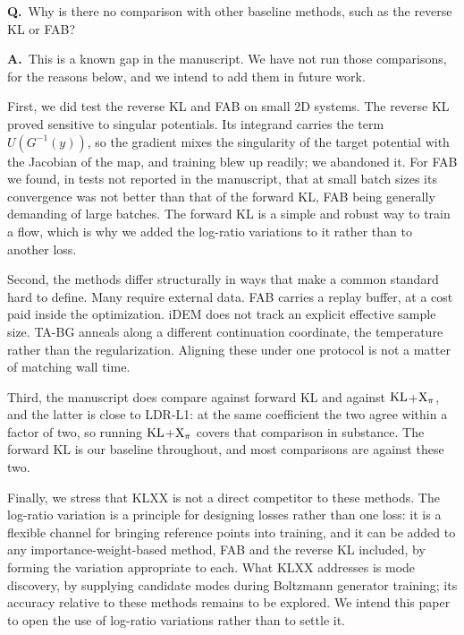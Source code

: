 \documentclass[11pt]{article}
\newcounter{qa}
\newcommand{\QA}[2]{%
  \par\bigskip
  \noindent\textbf{Q\theqa.}~#1\par
  \medskip
  \noindent\textbf{A\theqa.}~#2\par
  \medskip
}
\newcommand{\Q}[1]{\refstepcounter{qa}\QA{#1}}
\begin{document}
\Q{Why is there no comparison with other baseline methods, such as the reverse
KL or FAB?}
{This is a known gap in the manuscript. We have not run those comparisons, for
the reasons below, and we intend to add them in future work.

First, we did test the reverse KL and FAB on small 2D systems. The reverse KL
proved sensitive to singular potentials. Its integrand carries the term
$U(G^{-1}(y))$, so the gradient mixes the singularity of the target potential
with the Jacobian of the map, and training blew up readily; we abandoned it. For
FAB we found, in tests not reported in the manuscript, that at small batch sizes
its convergence was not better than that of the forward KL, FAB being generally
demanding of large batches. The forward KL is a simple and robust way to train a
flow, which is why we added the log-ratio variations to it rather than to
another loss.

Second, the methods differ structurally in ways that make a common standard hard
to define. Many require external data. FAB carries a replay buffer, at a cost
paid inside the optimization. iDEM does not track an explicit effective sample
size. TA-BG anneals along a different continuation coordinate, the temperature
rather than the regularization. Aligning these under one protocol is not a
matter of matching wall time.

Third, the manuscript does compare against forward KL and against
$\mathrm{KL}$+$\mathrm{X}_\pi$, and the latter is close to LDR-L1: at the same coefficient the
two agree within a factor of two, so running $\mathrm{KL}$+$\mathrm{X}_\pi$ covers that
comparison in substance. The forward KL is our baseline throughout, and most
comparisons are against these two.

Finally, we stress that KLXX is not a direct competitor to these methods. The
log-ratio variation is a principle for designing losses rather than one loss: it
is a flexible channel for bringing reference points into training, and it can be
added to any importance-weight-based method, FAB and the reverse KL included, by
forming the variation appropriate to each. What KLXX addresses is mode
discovery, by supplying candidate modes during Boltzmann generator training;
its accuracy relative to these methods remains to be explored. We intend this
paper to open the use of log-ratio variations rather than to settle it.}
\end{document}

